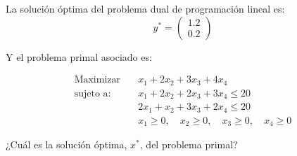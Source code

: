 
La solución óptima del problema dual de programación lineal es:
\[
y^* = \begin{pmatrix} 1.2 \\ 0.2 \end{pmatrix}
\]

Y el problema primal asociado es:

\[
\begin{aligned}
\text{Maximizar} \quad & x_1 + 2x_2 + 3x_3 + 4x_4 \\
\text{sujeto a:} \quad & x_1 + 2x_2 + 2x_3 + 3x_4 \leq 20 \\
& 2x_1 + x_2 + 3x_3 + 2x_4 \leq 20 \\
& x_1 \geq 0,\quad x_2 \geq 0,\quad x_3 \geq 0,\quad x_4 \geq 0
\end{aligned}
\]

¿Cuál es la solución óptima, \( x^* \), del problema primal?
